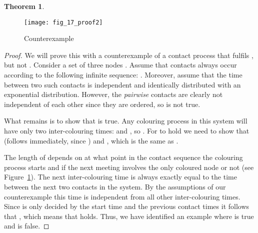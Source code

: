 \documentclass{article}
\newtheorem{theorem}{Theorem}
\begin{document}
\begin{theorem}
  
\end{theorem}
\begin{figure}[ht]
  \centering
  \texttt{[image: fig\_17\_proof2]}
  \caption{Counterexample}
  \label{fig:counterexample}
\end{figure}
\begin{proof}
  We will prove this with a counterexample of a contact process that
  fulfils , but not . Consider a set of three
  nodes . Assume that contacts always occur according to the
  following infinite sequence: \newline . Moreover, assume that the time between two such contacts is
  independent and identically distributed with an exponential
  distribution. However, the \emph{pairwise} contacts are clearly not
  independent of each other since they are ordered, so 
  is not true.

  What remains is to show that  is true. Any colouring
  process in this system will have only two inter-colouring times:
   and , so . For  to hold we need to show that  (follows immediately, since ) and , which is the same as .

  The length of  depends on at what point in the contact
  sequence the colouring process starts and if the next meeting
  involves the only coloured node or not (see
  Figure~\ref{fig:counterexample}).  The next inter-colouring time
   is always exactly equal to the time between the next two
  contacts in the system. By the assumptions of our counterexample
  this time is independent from all other inter-colouring times. Since
   is only decided by the start time and the previous contact
  times it follows that , which means that
   holds. Thus, we have identified an example where 
  is true and  is false.

\end{proof}
\end{document}
